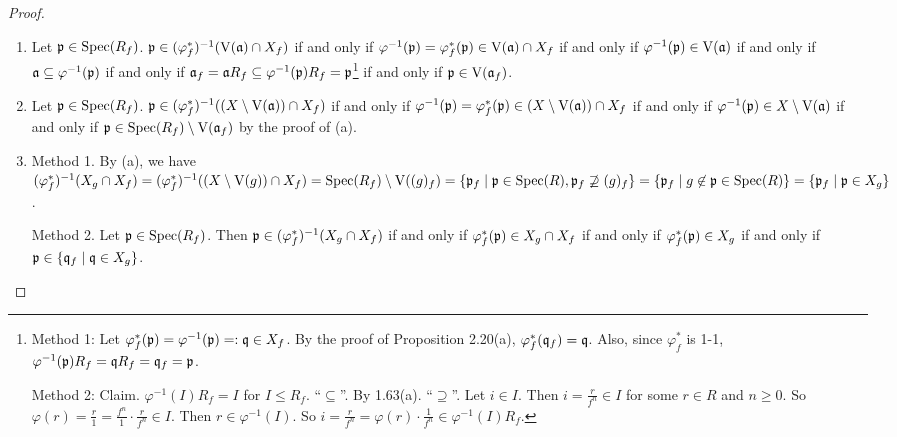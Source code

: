 \begin{proof}
    \begin{enumerate}
        \item Let $\mathfrak{p} \in \operatorname{Spec}(R_f)$. $\mathfrak{p} \in (\varphi_f^*)^{-1}(\operatorname{V}(\mathfrak{a}) \cap X_f)$ if and only if $\varphi^{-1}(\mathfrak{p}) = \varphi_f^*(\mathfrak{p}) \in \operatorname{V}(\mathfrak{a}) \cap X_f$ if and only if $\varphi^{-1}(\mathfrak{p}) \in \operatorname{V}(\mathfrak{a})$ if and only if $\mathfrak{a} \subseteq \varphi^{-1}(\mathfrak{p})$ if and only if $\mathfrak{a}_f = \mathfrak{a} R_f \subseteq \varphi^{-1}(\mathfrak{p})R_f = \mathfrak{p}$\footnote[2]{Method 1: Let $\varphi_f^*(\mathfrak{p}) = \varphi^{-1}(\mathfrak{p}) =: \mathfrak{q} \in X_f$. By the proof of Proposition 2.20(a), $\varphi_f^*(\mathfrak{q}_f) = \mathfrak{q}$. Also, since $\varphi_f^*$ is 1-1, $\varphi^{-1}(\mathfrak{p}) R_f = \mathfrak{q} R_f = \mathfrak{q}_f = \mathfrak{p}$. \par Method 2: Claim. $\varphi^{-1}(I)R_f = I$ for $I \leq R_f$. ``$\subseteq$''. By 1.63(a). ``$\supseteq$''. Let $i \in I$. Then $i = \frac{r}{f^n} \in I$ for some $r \in R$ and $n \geq 0$. So $\varphi(r) = \frac{r}{1} = \frac{f^n}{1} \cdot \frac{r}{f^n} \in I$. Then $r \in \varphi^{-1}(I)$. So $i = \frac{r}{f^n} = \varphi(r) \cdot \frac{1}{f^n} \in \varphi^{-1}(I) R_f$.} if and only if $\mathfrak{p} \in \operatorname{V}(\mathfrak{a}_f)$.
        \item Let $\mathfrak{p} \in \operatorname{Spec}(R_f)$. $\mathfrak{p} \in (\varphi_f^*)^{-1}((X \setminus \operatorname{V}(\mathfrak{a})) \cap X_f)$ if and only if $\varphi^{-1}(\mathfrak{p}) = \varphi_f^*(\mathfrak{p}) \in (X \setminus \operatorname{V}(\mathfrak{a})) \cap X_f$ if and only if $\varphi^{-1}(\mathfrak{p}) \in X \setminus \operatorname{V}(\mathfrak{a})$ if and only if $\mathfrak{p} \in \operatorname{Spec}(R_f) \setminus \operatorname{V}(\mathfrak{a}_f)$ by the proof of (a).
        \item Method 1. By (a), we have $(\varphi^*_f)^{-1}(X_g \cap X_f) = (\varphi^*_f)^{-1}((X \setminus \operatorname{V}(g)) \cap X_f) = \operatorname{Spec}(R_f) \setminus \operatorname{V}((g)_f) = \{\mathfrak{p}_f \mid \mathfrak{p} \in \operatorname{Spec}(R), \mathfrak{p}_f \not \supseteq (g)_f\} = \{\mathfrak{p}_f \mid g \not \in \mathfrak{p} \in \operatorname{Spec}(R)\} = \{\mathfrak{p}_f \mid \mathfrak{p} \in X_g\}$. \par 
            Method 2. Let $\mathfrak{p} \in \operatorname{Spec}(R_f)$. Then $\mathfrak{p} \in (\varphi_f^*)^{-1}(X_g \cap X_f)$ if and only if $\varphi_f^*(\mathfrak{p}) \in X_g \cap X_f$ if and only if $\varphi_f^*(\mathfrak{p}) \in X_g$ if and only if $\mathfrak{p} \in \{\mathfrak{q}_f \mid \mathfrak{q} \in X_g\}$. \qedhere
    \end{enumerate}
\end{proof}

